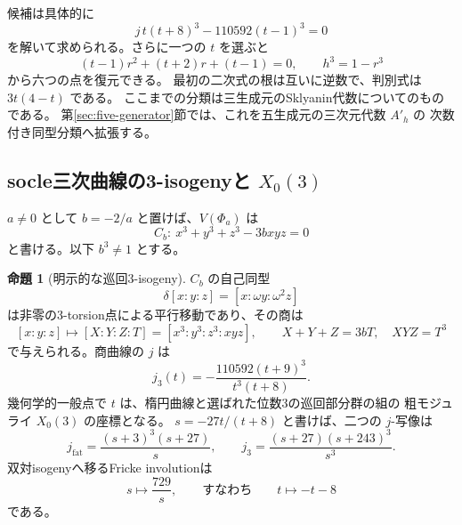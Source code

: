 \documentclass[a4paper,11pt]{ltjsarticle}
\theoremstyle{definition}
\newtheorem{theorem}{命題}[section]
\begin{document}
候補は具体的に
\[
 j\,t(t+8)^3-110592(t-1)^3=0
\]
を解いて求められる。さらに一つの $t$ を選ぶと
\[
 (t-1)r^2+(t+2)r+(t-1)=0,\qquad h^3=1-r^3
\]
から六つの点を復元できる。
最初の二次式の根は互いに逆数で、判別式は $3t(4-t)$ である。
ここまでの分類は三生成元のSklyanin代数についてのものである。
第\ref{sec:five-generator}節では、これを五生成元の三次元代数 $A'_h$ の
次数付き同型分類へ拡張する。

\subsection{socle三次曲線の3-isogenyと \texorpdfstring{$X_0(3)$}{X0(3)}}

$a\ne0$ として $b=-2/a$ と置けば、$V(\Phi_a)$ は
\[
 C_b:\ x^3+y^3+z^3-3bxyz=0
\]
と書ける。以下 $b^3\ne1$ とする。

\begin{theorem}[明示的な巡回3-isogeny]\label{thm:fat-three-isogeny}
$C_b$ の自己同型
\[
 \delta[x:y:z]=[x:\omega y:\omega^2z]
\]
は非零の3-torsion点による平行移動であり、その商は
\begin{equation}\label{eq:fat-isogeny-quotient}
 [x:y:z]\longmapsto[X:Y:Z:T]=[x^3:y^3:z^3:xyz],\qquad
 X+Y+Z=3bT,\quad XYZ=T^3
\end{equation}
で与えられる。商曲線の $j$ は
\begin{equation}\label{eq:fat-isogeny-j}
 j_3(t)=-\frac{110592(t+9)^3}{t^3(t+8)}.
\end{equation}
幾何学的一般点で $t$ は、楕円曲線と選ばれた位数3の巡回部分群の組の
粗モジュライ $X_0(3)$ の座標となる。
$s=-27t/(t+8)$ と書けば、二つの $j$-写像は
\begin{equation}\label{eq:x03-j-pair}
 j_{\mathrm{fat}}=\frac{(s+3)^3(s+27)}s,\qquad
 j_3=\frac{(s+27)(s+243)^3}{s^3}.
\end{equation}
双対isogenyへ移るFricke involutionは
\begin{equation}\label{eq:fat-fricke}
 s\longmapsto\frac{729}s,
 \qquad\text{すなわち}\qquad t\longmapsto-t-8
\end{equation}
である。
\end{theorem}
\end{document}
